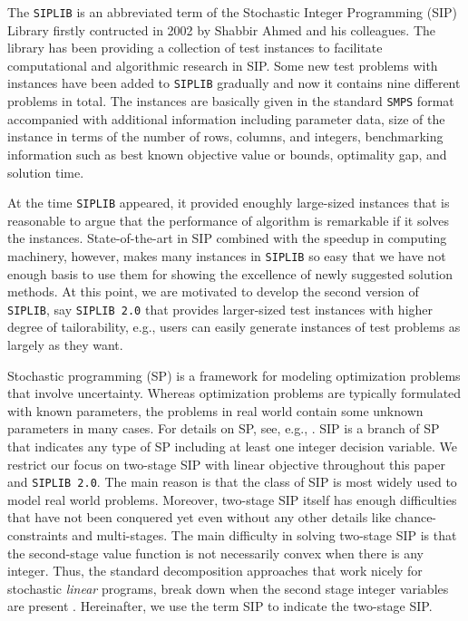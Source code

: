 The \texttt{SIPLIB} \cite{web:SIPLIB1} is an abbreviated term of the Stochastic Integer Programming (SIP) Library firstly contructed in 2002 by Shabbir Ahmed and his colleagues. The library has been providing a collection of test instances to facilitate computational and algorithmic research in SIP. Some new test problems with instances have been added to \texttt{SIPLIB} gradually and now it contains nine different problems in total. The instances are basically given in the standard \texttt{SMPS} format accompanied with additional information including parameter data, size of the instance in terms of the number of rows, columns, and integers, benchmarking information such as best known objective value or bounds, optimality gap, and solution time.

At the time \texttt{SIPLIB} appeared, it provided enoughly large-sized instances that is reasonable to argue that the performance of algorithm is remarkable if it solves the instances. State-of-the-art in SIP combined with the speedup in computing machinery, however, makes many instances in \texttt{SIPLIB} so easy that we have not enough basis to use them for showing the excellence of newly suggested solution methods. At this point, we are motivated to develop the second version of \texttt{SIPLIB}, say \texttt{SIPLIB 2.0} that provides larger-sized test instances with higher degree of tailorability, e.g., users can easily generate instances of test problems as largely as they want.%

Stochastic programming (SP) is a framework for modeling optimization problems that involve uncertainty. Whereas optimization problems are typically formulated with known parameters, the problems in real world contain some unknown parameters in many cases. For details on SP, see, e.g., \cite{web:SPS,book:BL2011}. SIP is a branch of SP that indicates any type of SP including at least one integer decision variable. We restrict our focus on two-stage SIP with linear objective throughout this paper and \texttt{SIPLIB 2.0}. The main reason is that the class of SIP is most widely used to model real world problems. Moreover, two-stage SIP itself has enough difficulties that have not been conquered yet even without any other details like chance-constraints and multi-stages. The main difficulty in solving two-stage SIP is that the second-stage value function is not necessarily convex when there is any integer. Thus, the standard decomposition approaches that work nicely for stochastic \textit{linear} programs, break down when the second stage integer variables are present \cite{journal:AG2004}. Hereinafter, we use the term SIP to indicate the two-stage SIP.

